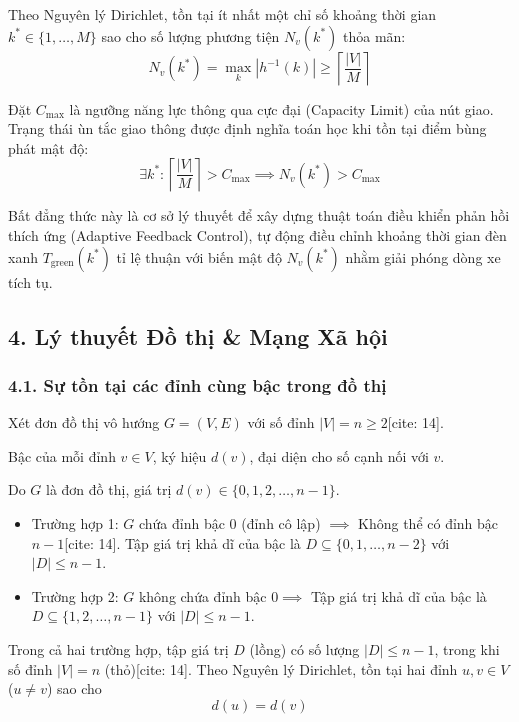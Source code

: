 \documentclass[12pt,a4paper]{article}
\theoremstyle{definition}
\begin{document}
\noindent Theo Nguyên lý Dirichlet, tồn tại ít nhất một chỉ số khoảng thời gian $k^* \in \{1, \dots, M\}$ sao cho số lượng phương tiện $N_v(k^*)$ thỏa mãn:
\[
N_v(k^*) = \max_{k} |h^{-1}(k)| \ge \left\lceil \frac{|V|}{M} \right\rceil
\]

\noindent Đặt $C_{\max}$ là ngưỡng năng lực thông qua cực đại (Capacity Limit) của nút giao. Trạng thái ùn tắc giao thông được định nghĩa toán học khi tồn tại điểm bùng phát mật độ:
\[
\exists k^* : \left\lceil \frac{|V|}{M} \right\rceil > C_{\max} \implies N_v(k^*) > C_{\max}
\]

\noindent Bất đẳng thức này là cơ sở lý thuyết để xây dựng thuật toán điều khiển phản hồi thích ứng (Adaptive Feedback Control), tự động điều chỉnh khoảng thời gian đèn xanh $T_{\text{green}}(k^*)$ tỉ lệ thuận với biến mật độ $N_v(k^*)$ nhằm giải phóng dòng xe tích tụ.

\subsection*{4. Lý thuyết Đồ thị \& Mạng Xã hội}

\subsubsection*{4.1. Sự tồn tại các đỉnh cùng bậc trong đồ thị}
Xét đơn đồ thị vô hướng $G = (V, E)$ với số đỉnh $|V| = n \ge 2$[cite: 14].

\noindent Bậc của mỗi đỉnh $v \in V$, ký hiệu $d(v)$, đại diện cho số cạnh nối với $v$.

\noindent Do $G$ là đơn đồ thị, giá trị $d(v) \in \{0, 1, 2, \dots, n - 1\}$.

\begin{itemize}[leftmargin=1.2cm, itemsep=3pt, topsep=2pt]
    \item Trường hợp 1: $G$ chứa đỉnh bậc $0$ (đỉnh cô lập) $\implies$ Không thể có đỉnh bậc $n - 1$[cite: 14]. Tập giá trị khả dĩ của bậc là $D \subseteq \{0, 1, \dots, n - 2\}$ với $|D| \le n - 1$.
    \item Trường hợp 2: $G$ không chứa đỉnh bậc $0 \implies$ Tập giá trị khả dĩ của bậc là $D \subseteq \{1, 2, \dots, n - 1\}$ với $|D| \le n - 1$.
\end{itemize}

\noindent Trong cả hai trường hợp, tập giá trị $D$ (lồng) có số lượng $|D| \le n - 1$, trong khi số đỉnh $|V| = n$ (thỏ)[cite: 14]. Theo Nguyên lý Dirichlet, tồn tại hai đỉnh $u, v \in V$ ($u \neq v$) sao cho
\[
d(u) = d(v)
\]
\end{document}
